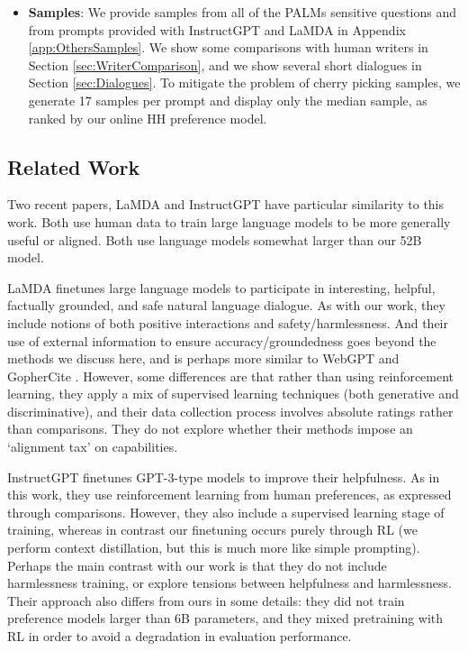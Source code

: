 \begin{itemize}
    \item {\bf Samples}:  We provide samples from all of the PALMs \cite{PALMS} sensitive questions and from  prompts provided with InstructGPT \cite{InstructGPT} and LaMDA \cite{LaMDA} in Appendix \ref{app:OthersSamples}.  We show some comparisons with human writers in Section \ref{sec:WriterComparison}, and we show several short  dialogues in Section \ref{sec:Dialogues}. To mitigate the problem of cherry picking samples, we generate 17 samples per prompt and display only the median sample, as ranked by our online HH preference model. 

\end{itemize}

\subsection{Related Work}

Two recent papers, LaMDA \cite{LaMDA} and InstructGPT \cite{InstructGPT} have particular similarity to this work.  Both use human data to train large language models to be more generally useful or aligned.  Both use language models somewhat larger than our 52B model.

LaMDA \cite{LaMDA} finetunes large language models to participate in interesting, helpful, factually grounded, and safe natural language dialogue.  As with our work, they include notions of both positive interactions and safety/harmlessness.  And their use of external information to ensure accuracy/groundedness goes beyond the methods we discuss here, and is perhaps more similar to WebGPT and GopherCite \cite{WebGPT, GopherCite}.  However, some differences are that rather than using reinforcement learning, they apply a mix of supervised learning techniques (both generative and discriminative), and their data collection process involves absolute ratings rather than comparisons. They do not explore whether their methods impose an `alignment tax' on capabilities. 

InstructGPT \cite{InstructGPT} finetunes GPT-3-type models \cite{brown2020language} to improve their helpfulness.  As in this work, they use reinforcement learning from human preferences, as expressed through comparisons.  However, they also include a supervised learning stage of training, whereas in contrast our finetuning occurs purely through RL (we perform context distillation, but this is much more like simple prompting).  Perhaps the main contrast with our work is that they do not include harmlessness training, or explore tensions between helpfulness and harmlessness.  Their approach also differs from ours in some details: they did not train preference models larger than 6B parameters, and they mixed pretraining with RL in order to avoid a degradation in evaluation performance.


